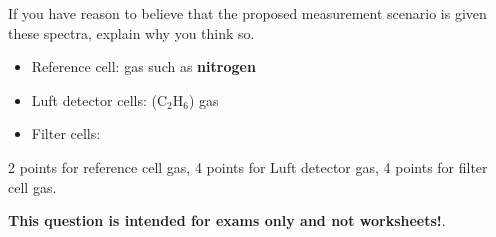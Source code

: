 \vskip 10pt

If you have reason to believe that the proposed measurement scenario is  given these spectra, explain why you think so.







\begin{itemize}
\item{} Reference cell:  gas such as {\bf nitrogen}
\vskip 5pt
\item{} Luft detector cells:  (C$_{2}$H$_{6}$) gas
\vskip 5pt
\item{} Filter cells: 
\end{itemize}

2 points for reference cell gas, 4 points for Luft detector gas, 4 points for filter cell gas.







{\bf This question is intended for exams only and not worksheets!}.




